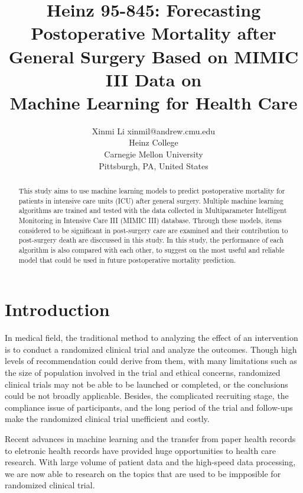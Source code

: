 \documentclass[twoside,11pt]{article}
\begin{document}
\title{Heinz 95-845: Forecasting Postoperative Mortality after General Surgery Based on MIMIC III Data on \\Machine Learning for Health Care}

\author{\name Xinmi Li \email xinmil@andrew.cmu.edu \\
       \addr Heinz College\\
       Carnegie Mellon University\\
       Pittsburgh, PA, United States
       } 

\maketitle

\begin{abstract}
  This study aims to use machine learning models to predict postoperative mortality for patients in intensive care units (ICU) after general surgery. Multiple machine learning algorithms are trained and tested with the data collected in Multiparameter Intelligent Monitoring in Intensive Care III (MIMIC III) database. Through these models, items considered to be significant in post-surgery care are examined and their contribution to post-surgery death are disccussed in this study. In this study, the performance of each algorithm is also compared with each other, to suggest on the most useful and reliable model that could be used in future postoperative mortality prediction.
\end{abstract}

\section{Introduction}
In medical field, the traditional method to analyzing the effect of an intervention is to conduct a randomized clinical trial and analyze the outcomes. Though high levels of recommendation could derive from them, with many limitations such as the size of population involved in the trial and ethical concerns, randomized clinical trials may not be able to be launched or completed, or the conclusions could be not broadly applicable. Besides, the complicated recruiting stage, the compliance issue of participants, and the long period of the trial and follow-ups make the randomized clinical trial unefficient and costly.

Recent advances in machine learning and the transfer from paper health records to eletronic health records have provided huge opportunities to health care research. With large volume of patient data and the high-speed data processing, we are now able to research on the topics that are used to be impposible for randomized clinical trial. 
\end{document}
